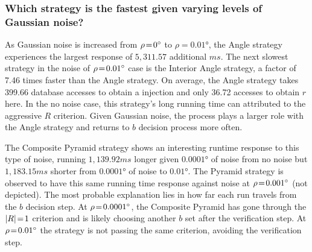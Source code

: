 \subsubsection{Which strategy is the fastest given varying levels of Gaussian noise?}
As Gaussian noise is increased from $\rho\!=\!\ang{0}$ to $\rho=\ang{0.01}$, the Angle strategy experiences the largest
response of $5{,}311.57$ additional $\si{ms}$.
The next slowest strategy in the noise of $\rho\!=\!\ang{0.01}$ case is the Interior Angle strategy, a factor of 7.46 times
faster than the Angle strategy.
On average, the Angle strategy takes 399.66 database accesses to obtain a injection and only 36.72 accesses
to obtain $r$ here.
In the no noise case, this strategy's long running time can attributed to the aggressive $R$ criterion.
Given Gaussian noise, the  process plays a larger role with the Angle strategy and returns to $b$
decision process more often.

The Composite Pyramid strategy shows an interesting runtime response to this type of noise, running $1{,}139.92\si{ms}$
longer given $\ang{0.0001}$ of noise from no noise but $1{,}183.15\si{ms}$ shorter from $\ang{0.0001}$ of noise to
$\ang{0.01}$.
The Pyramid strategy is observed to have this same running time response against noise at $\rho\!=\!\ang{0.001}$
(not depicted).
The most probable explanation lies in how far each run travels from the $b$ decision step.
At $\rho\!=\!\ang{0.0001}$, the Composite Pyramid has gone through the $\left| R \right| \!=\! 1$ criterion and is likely choosing
another $b$ set after the verification step.
At $\rho\!=\!\ang{0.01}$ the strategy is not passing the same criterion, avoiding the verification step.

